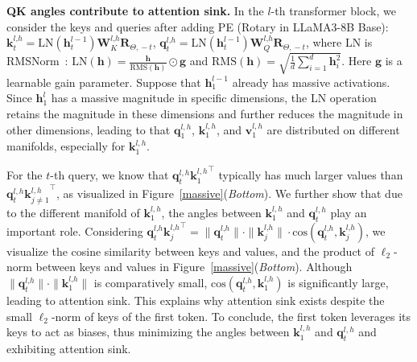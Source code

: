 \documentclass{article} \usepackage{iclr2025_conference,times}
\begin{document}
\textbf{QK angles contribute to attention sink.}  In the $l$-th transformer block, we consider the keys and queries after adding PE (Rotary in LLaMA3-8B Base): $\boldsymbol{k}_t^{l\textrm{,}h}=\textrm{LN}(\boldsymbol{h}_t^{l-1})\boldsymbol{W}_{K}^{l\textrm{,}h}\boldsymbol{R}_{\Theta\textrm{,}\,-t}$, $\boldsymbol{q}_t^{l\textrm{,}h}=\textrm{LN}(\boldsymbol{h}_t^{l-1})\boldsymbol{W}_{Q}^{l\textrm{,}h}\boldsymbol{R}_{\Theta\textrm{,}\,-t}$, where LN is RMSNorm~\citep{zhang2019root}: $\textrm{LN}(\boldsymbol{h})=\frac{\boldsymbol{h}}{\textrm{RMS}(\boldsymbol{h})}\odot\boldsymbol{g}$ and $\textrm{RMS}(\boldsymbol{h})=\sqrt{\frac{1}{d}\sum_{i=1}^d\boldsymbol{h}_i^2}$.
Here $\boldsymbol{g}$ is a learnable gain parameter. Suppose that $\boldsymbol{h}_1^{l-1}$ already has massive activations. Since $\boldsymbol{h}_1^{l}$ has a massive magnitude in specific dimensions, the LN operation retains the magnitude in these dimensions and further reduces the magnitude in other dimensions, leading to that $\boldsymbol{q}_1^{l\textrm{,}\,h}$,  $\boldsymbol{k}_1^{l\textrm{,}\,h}$, and  $\boldsymbol{v}_1^{l\textrm{,}\,h}$ are distributed on different manifolds, especially for $\boldsymbol{k}_1^{l\textrm{,}\,h}$. 

For the $t$-th query, we know that $\boldsymbol{q}_t^{l\textrm{,}\,h}{\boldsymbol{k}_{1}^{l\textrm{,}\,h}}^\top$ typically has much larger values than $\boldsymbol{q}_t^{l\textrm{,}\,h}{\boldsymbol{k}_{j\neq 1}^{l\textrm{,}\,h}}^\top$, as visualized in Figure~\ref{massive}(\emph{Bottom}). We further show that due to the different manifold of $\boldsymbol{k}_1^{l\textrm{,}\,h}$, the angles between $\boldsymbol{k}_1^{l\textrm{,}\,h}$ and $\boldsymbol{q}_{t}^{l\textrm{,}\,h}$ play an important role. Considering $\boldsymbol{q}_t^{l\textrm{,}h}{\boldsymbol{k}_j^{l\textrm{,}h}}^\top=\|\boldsymbol{q}_t^{l\textrm{,}h}\|\cdot\|\boldsymbol{k}_j^{l\textrm{,}h}\|\cdot\textrm{cos}(\boldsymbol{q}_t^{l\textrm{,}h}\textrm{,}\,\boldsymbol{k}_j^{l\textrm{,}h})$, we visualize the cosine similarity between keys and values, and the product of $\ell_2$-norm between keys and values in Figure~\ref{massive}(\emph{Bottom}). Although $\|\boldsymbol{q}_t^{l\textrm{,}h}\|\cdot\|\boldsymbol{k}_1^{l\textrm{,}h}\|$ is comparatively small,  $\textrm{cos}(\boldsymbol{q}_t^{l\textrm{,}h}\textrm{,}\,\boldsymbol{k}_1^{l\textrm{,}h})$ is significantly large, leading to attention sink. This explains why attention sink exists despite the small $\ell_2$-norm of keys of the first token. To conclude,  the first token leverages its keys to act as biases, thus minimizing the angles between $\boldsymbol{k}_{1}^{l\textrm{,}\,h}$ and $\boldsymbol{q}_{t}^{l\textrm{,}\,h}$ and exhibiting attention sink.
\end{document}
